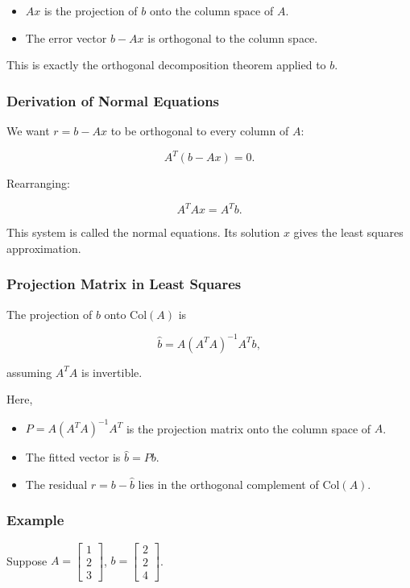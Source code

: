 \documentclass[
  letterpaper,
  DIV=11,
  numbers=noendperiod]{scrreprt}
\providecommand{\tightlist}{%
  \setlength{\itemsep}{0pt}\setlength{\parskip}{0pt}}
\begin{document}
\begin{itemize}
\tightlist
\item
  \(Ax\) is the projection of \(b\) onto the column space of \(A\).
\item
  The error vector \(b - Ax\) is orthogonal to the column space.
\end{itemize}

This is exactly the orthogonal decomposition theorem applied to \(b\).

\subsubsection{Derivation of Normal
Equations}\label{derivation-of-normal-equations}

We want \(r = b - Ax\) to be orthogonal to every column of \(A\):

\[
A^T (b - Ax) = 0.
\]

Rearranging:

\[
A^T A x = A^T b.
\]

This system is called the normal equations. Its solution \(x\) gives the
least squares approximation.

\subsubsection{Projection Matrix in Least
Squares}\label{projection-matrix-in-least-squares}

The projection of \(b\) onto \(\text{Col}(A)\) is

\[
\hat{b} = A(A^T A)^{-1} A^T b,
\]

assuming \(A^T A\) is invertible.

Here,

\begin{itemize}
\tightlist
\item
  \(P = A(A^T A)^{-1} A^T\) is the projection matrix onto the column
  space of \(A\).
\item
  The fitted vector is \(\hat{b} = Pb\).
\item
  The residual \(r = b - \hat{b}\) lies in the orthogonal complement of
  \(\text{Col}(A)\).
\end{itemize}

\subsubsection{Example}\label{example-2}

Suppose \(A = \begin{bmatrix}1 \\ 2 \\ 3\end{bmatrix}\),
\(b = \begin{bmatrix}2 \\ 2 \\ 4\end{bmatrix}\).
\end{document}
